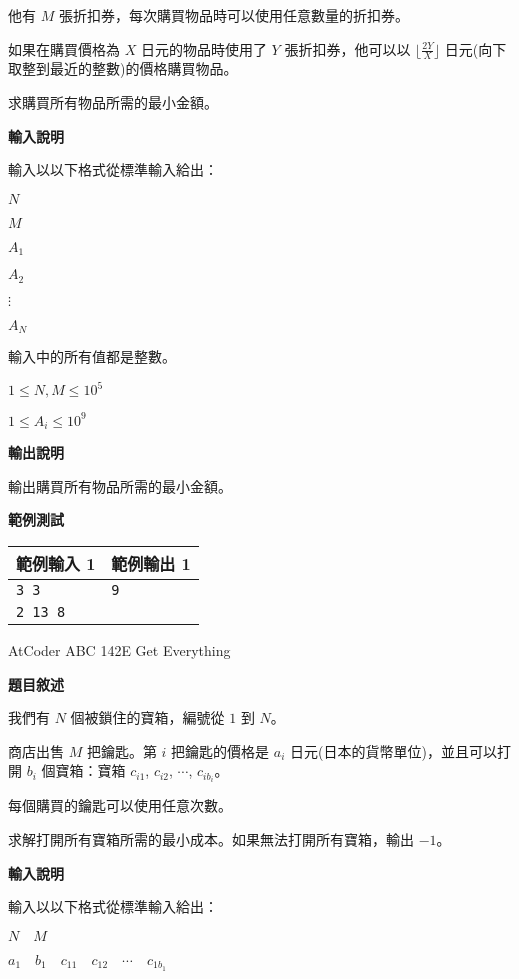     他有 $M$ 張折扣券，每次購買物品時可以使用任意數量的折扣券。
    
    如果在購買價格為 $X$ 日元的物品時使用了 $Y$ 張折扣券，他可以以 $\lfloor \frac{2Y}{X} \rfloor$ 日元(向下取整到最近的整數)的價格購買物品。
    
    求購買所有物品所需的最小金額。

    \textbf{輸入說明}

    輸入以以下格式從標準輸入給出：

    $N$

    $M$

    $A_1$

    $A_2$

    $\vdots$

    $A_N$

    輸入中的所有值都是整數。

    $1 \le N, M \le 10^5$

    $1 \le A_i \le 10^9$

    \textbf{輸出說明}

    輸出購買所有物品所需的最小金額。

    \textbf{範例測試}

    \begin{tabular}{|m{7cm}|m{7cm}|}
        \hline
        範例輸入 1 & 範例輸出 1 \\
        \hline
        \verb|3 3| & \verb|9| \\
        \verb|2 13 8| & \\
        \hline
    \end{tabular}

    \problem AtCoder ABC 142E Get Everything

    \textbf{題目敘述}

    我們有 $N$ 個被鎖住的寶箱，編號從 $1$ 到 $N$。

    商店出售 $M$ 把鑰匙。第 $i$ 把鑰匙的價格是 $a_i$ 日元(日本的貨幣單位)，並且可以打開 $b_i$ 個寶箱：寶箱 $c_{i1}$, $c_{i2}$, $\cdots$, $c_{ib_i}$。
    
    每個購買的鑰匙可以使用任意次數。
    
    求解打開所有寶箱所需的最小成本。如果無法打開所有寶箱，輸出 $-1$。

    \textbf{輸入說明}

    輸入以以下格式從標準輸入給出：

    $N \quad M$
    
    $a_1 \quad b_1 \quad c_{11} \quad c_{12} \quad \cdots \quad c_{1b_1}$
    
